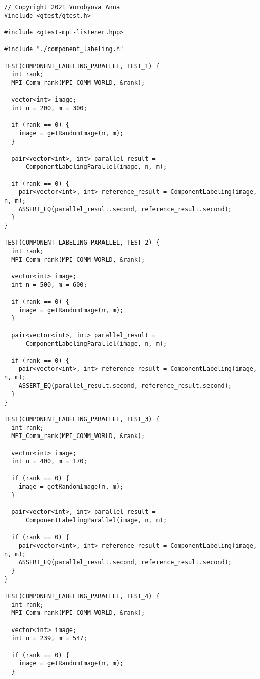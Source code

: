 \documentclass{report}
\begin{document}
\begin{lstlisting}
// Copyright 2021 Vorobyova Anna
#include <gtest/gtest.h>

#include <gtest-mpi-listener.hpp>

#include "./component_labeling.h"

TEST(COMPONENT_LABELING_PARALLEL, TEST_1) {
  int rank;
  MPI_Comm_rank(MPI_COMM_WORLD, &rank);

  vector<int> image;
  int n = 200, m = 300;

  if (rank == 0) {
    image = getRandomImage(n, m);
  }

  pair<vector<int>, int> parallel_result =
      ComponentLabelingParallel(image, n, m);

  if (rank == 0) {
    pair<vector<int>, int> reference_result = ComponentLabeling(image, n, m);
    ASSERT_EQ(parallel_result.second, reference_result.second);
  }
}

TEST(COMPONENT_LABELING_PARALLEL, TEST_2) {
  int rank;
  MPI_Comm_rank(MPI_COMM_WORLD, &rank);

  vector<int> image;
  int n = 500, m = 600;

  if (rank == 0) {
    image = getRandomImage(n, m);
  }

  pair<vector<int>, int> parallel_result =
      ComponentLabelingParallel(image, n, m);

  if (rank == 0) {
    pair<vector<int>, int> reference_result = ComponentLabeling(image, n, m);
    ASSERT_EQ(parallel_result.second, reference_result.second);
  }
}

TEST(COMPONENT_LABELING_PARALLEL, TEST_3) {
  int rank;
  MPI_Comm_rank(MPI_COMM_WORLD, &rank);

  vector<int> image;
  int n = 400, m = 170;

  if (rank == 0) {
    image = getRandomImage(n, m);
  }

  pair<vector<int>, int> parallel_result =
      ComponentLabelingParallel(image, n, m);

  if (rank == 0) {
    pair<vector<int>, int> reference_result = ComponentLabeling(image, n, m);
    ASSERT_EQ(parallel_result.second, reference_result.second);
  }
}

TEST(COMPONENT_LABELING_PARALLEL, TEST_4) {
  int rank;
  MPI_Comm_rank(MPI_COMM_WORLD, &rank);

  vector<int> image;
  int n = 239, m = 547;

  if (rank == 0) {
    image = getRandomImage(n, m);
  }


\end{lstlisting}
\end{document}
